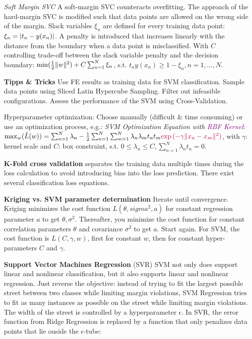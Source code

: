 \textit{Soft Margin SVC}
A soft-margin SVC counteracts overfitting.
The approach of the hard-margin SVC is modified such that data points are allowed on the wrong side of the margin.
Slack variables $\xi_n$ are defined for every training data point: $\xi_n = \lvert t_n-y(x_n) \rvert$.
A penalty is introduced that increases linearly with the distance from the boundary when a data point is misclassified.
With $C$ controlling trade-off between the slack variable penalty and the decision boundary: $\min(\frac{1}{2}\lVert w \rVert^2)+C\sum_{n=1}^{N} \xi_n$, s.t. $t_n y(x_n) \geq 1 - \xi_n, n = 1,..., N$.

\textbf{Tipps \& Tricks}
Use FE results as training data for SVM classification.
Sample data points using Sliced Latin Hypercube Sampling. Filter out infeasible configurations.
Assess the performance of the SVM using Cross-Validation.

Hyperparameter optimization: Choose manually (difficult \& time consuming) or use an optimization process, e.g.:
\textit{SVM Optimization Equation with \textcolor{purple}{RBF Kernel}}: $\max_w (\Tilde{L}(w)) = \sum_{n=1}^N \lambda_n - \frac{1}{2} \sum_{n=1}^N \sum_{m=1}^N \lambda_n \lambda_m t_n t_m \textcolor{purple}{\exp{(-\gamma\lVert x_n-x_m \rVert^2)}}$, with $\gamma$: kernel scale and $C$: box constraint, s.t. $0\leq \lambda_n \leq C, \sum_{n=1}^N \lambda_n t_n = 0$.

\textbf{K-Fold cross validation} 
separates the training data multiple times during the loss calculation to avoid introducing bias into the loss prediction.
There exist several classification loss equations.

\textbf{Kriging vs. SVM parameter determination}
Iterate until convergence. 
Kriging minimizes the cost function $L(\theta,sigma^2, a)$ for constant regression parameter $a$ to get $\theta, \sigma^2$. 
Thereafter, you minimize the cost function for constant correlation parameters $\theta$ and covariance $\sigma^2$ to get $a$. Start again.
For SVM, the cost function is $L(C, \gamma, w)$, first for constant $w$, then for constant hyper-parameters $C$ and $\gamma$.

\textbf{Support Vector Machines Regression} (SVR)
SVM not only does support linear and nonlinear classification, but it also supports linear and nonlinear regression.
Just reverse the objective: instead of trying to fit the largest possible street between two classes while limiting margin violations, SVM Regression tries to fit as many instances as possible on the street while limiting margin violations.
The width of the street is controlled by a hyperparameter $\epsilon$.
In SVR, the error function from Ridge Regression is replaced by a function that only penalizes data points that lie ouside the $\epsilon$-tube:

